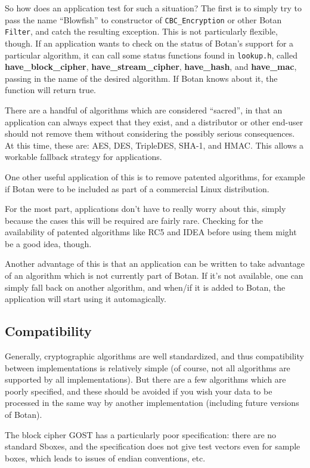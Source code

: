 \documentclass{article}
\newcommand{\filename}[1]{\texttt{#1}}
\newcommand{\function}[1]{\textbf{#1}}
\newcommand{\type}[1]{\texttt{#1}}
\begin{document}
So how does an application test for such a situation? The first is to simply
try to pass the name ``Blowfish'' to constructor of \type{CBC\_Encryption} or
other Botan \type{Filter}, and catch the resulting exception. This is not
particularly flexible, though. If an application wants to check on the status
of Botan's support for a particular algorithm, it can call some status
functions found in \filename{lookup.h}, called \function{have\_block\_cipher},
\function{have\_stream\_cipher}, \function{have\_hash}, and
\function{have\_mac}, passing in the name of the desired algorithm. If Botan
knows about it, the function will return true.

There are a handful of algorithms which are considered ``sacred'', in that an
application can always expect that they exist, and a distributor or other
end-user should not remove them without considering the possibly serious
consequences. At this time, these are: AES, DES, TripleDES, SHA-1, and HMAC.
This allows a workable fallback strategy for applications.

One other useful application of this is to remove patented algorithms, for
example if Botan were to be included as part of a commercial Linux
distribution.

For the most part, applications don't have to really worry about this, simply
because the cases this will be required are fairly rare. Checking for the
availability of patented algorithms like RC5 and IDEA before using them might
be a good idea, though.

Another advantage of this is that an application can be written to take
advantage of an algorithm which is not currently part of Botan. If it's not
available, one can simply fall back on another algorithm, and when/if it is
added to Botan, the application will start using it automagically.

\subsection{Compatibility}

Generally, cryptographic algorithms are well standardized, and thus
compatibility between implementations is relatively simple (of course, not all
algorithms are supported by all implementations). But there are a few
algorithms which are poorly specified, and these should be avoided if you wish
your data to be processed in the same way by another implementation (including
future versions of Botan).

The block cipher GOST has a particularly poor specification: there are no
standard Sboxes, and the specification does not give test vectors even for
sample boxes, which leads to issues of endian conventions, etc.
\end{document}
